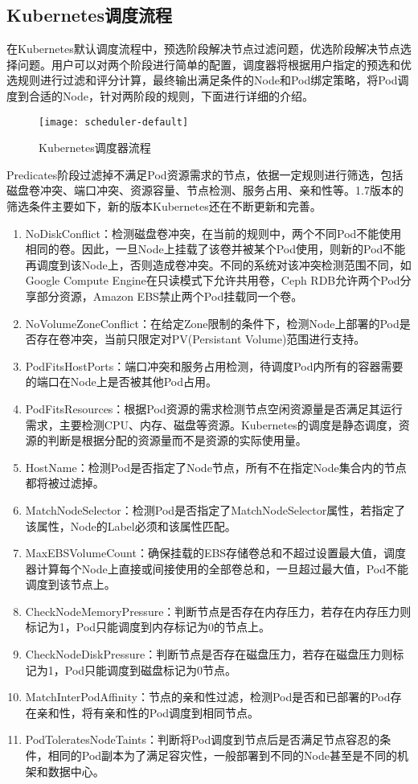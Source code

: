 \subsection{Kubernetes调度流程}
在Kubernetes默认调度流程中，预选阶段解决节点过滤问题，优选阶段解决节点选择问题。用户可以对两个阶段进行简单的配置，调度器将根据用户指定的预选和优选规则进行过滤和评分计算，最终输出满足条件的Node和Pod绑定策略，将Pod调度到合适的Node，针对两阶段的规则，下面进行详细的介绍。
\begin{figure}[H] %
	\centering
	\texttt{[image: scheduler-default]}
	\caption{Kubernetes调度器流程}
\end{figure}
Predicates阶段过滤掉不满足Pod资源需求的节点，依据一定规则进行筛选，包括磁盘卷冲突、端口冲突、资源容量、节点检测、服务占用、亲和性等。1.7版本的筛选条件主要如下，新的版本Kubernetes还在不断更新和完善。
\begin{enumerate}[(1)]
	\item NoDiskConflict：检测磁盘卷冲突，在当前的规则中，两个不同Pod不能使用相同的卷。因此，一旦Node上挂载了该卷并被某个Pod使用，则新的Pod不能再调度到该Node上，否则造成卷冲突。不同的系统对该冲突检测范围不同，如Google Compute Engine在只读模式下允许共用卷，Ceph RDB允许两个Pod分享部分资源，Amazon EBS禁止两个Pod挂载同一个卷。
	\item NoVolumeZoneConflict：在给定Zone限制的条件下，检测Node上部署的Pod是否存在卷冲突，当前只限定对PV(Persistant Volume)范围进行支持。
	\item PodFitsHostPorts：端口冲突和服务占用检测，待调度Pod内所有的容器需要的端口在Node上是否被其他Pod占用。
	\item PodFitsResources：根据Pod资源的需求检测节点空闲资源量是否满足其运行需求，主要检测CPU、内存、磁盘等资源。Kubernetes的调度是静态调度，资源的判断是根据分配的资源量而不是资源的实际使用量。
	\item HostName：检测Pod是否指定了Node节点，所有不在指定Node集合内的节点都将被过滤掉。
	\item MatchNodeSelector：检测Pod是否指定了MatchNodeSelector属性，若指定了该属性，Node的Label必须和该属性匹配。
	\item MaxEBSVolumeCount：确保挂载的EBS存储卷总和不超过设置最大值，调度器计算每个Node上直接或间接使用的全部卷总和，一旦超过最大值，Pod不能调度到该节点上。
	\item CheckNodeMemoryPressure：判断节点是否存在内存压力，若存在内存压力则标记为1，Pod只能调度到内存标记为0的节点上。
	\item CheckNodeDiskPressure：判断节点是否存在磁盘压力，若存在磁盘压力则标记为1，Pod只能调度到磁盘标记为0节点。
	\item MatchInterPodAffinity：节点的亲和性过滤，检测Pod是否和已部署的Pod存在亲和性，将有亲和性的Pod调度到相同节点。
	\item PodToleratesNodeTaints：判断将Pod调度到节点后是否满足节点容忍的条件，相同的Pod副本为了满足容灾性，一般部署到不同的Node甚至是不同的机架和数据中心。
\end{enumerate}

